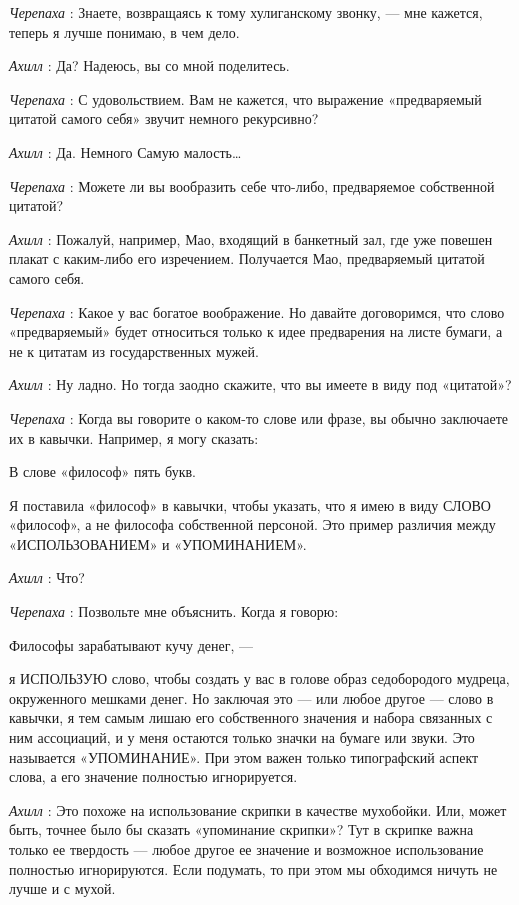 \emph{Черепаха} : Знаете, возвращаясь к тому хулиганскому звонку, --- мне кажется, теперь я лучше понимаю, в чем дело.

\emph{Ахилл} : Да? Надеюсь, вы со мной поделитесь.

\emph{Черепаха} : С удовольствием. Вам не кажется, что выражение «предваряемый цитатой самого себя» звучит немного рекурсивно?

\emph{Ахилл} : Да. Немного Самую малость\ldots{}

\emph{Черепаха} : Можете ли вы вообразить себе что-либо, предваряемое собственной цитатой?

\emph{Ахилл} : Пожалуй, например, Мао, входящий в банкетный зал, где уже повешен плакат с каким-либо его изречением. Получается Мао, предваряемый цитатой самого себя.

\emph{Черепаха} : Какое у вас богатое воображение. Но давайте договоримся, что слово «предваряемый» будет относиться только к идее предварения на листе бумаги, а не к цитатам из государственных мужей.

\emph{Ахилл} : Ну ладно. Но тогда заодно скажите, что вы имеете в виду под «цитатой»?

\emph{Черепаха} : Когда вы говорите о каком-то слове или фразе, вы обычно заключаете их в кавычки. Например, я могу сказать:

В слове «философ» пять букв.

Я поставила «философ» в кавычки, чтобы указать, что я имею в виду СЛОВО «философ», а не философа собственной персоной. Это пример различия между «ИСПОЛЬЗОВАНИЕМ» и «УПОМИНАНИЕМ».

\emph{Ахилл} : Что?

\emph{Черепаха} : Позвольте мне объяснить. Когда я говорю:

Философы зарабатывают кучу денег, ---

я ИСПОЛЬЗУЮ слово, чтобы создать у вас в голове образ седобородого мудреца, окруженного мешками денег. Но заключая это --- или любое другое --- слово в кавычки, я тем самым лишаю его собственного значения и набора связанных с ним ассоциаций, и у меня остаются только значки на бумаге или звуки. Это называется «УПОМИНАНИЕ». При этом важен только типографский аспект слова, а его значение полностью игнорируется.

\emph{Ахилл} : Это похоже на использование скрипки в качестве мухобойки. Или, может быть, точнее было бы сказать «упоминание скрипки»? Тут в скрипке важна только ее твердость --- любое другое ее значение и возможное использование полностью игнорируются. Если подумать, то при этом мы обходимся ничуть не лучше и с мухой.

